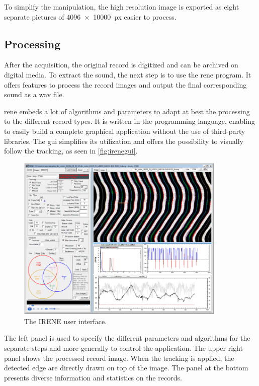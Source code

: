 To simplify the manipulation, the high resolution image is exported as eight separate pictures of \SI[product-units=single]{4096x10000}{px} easier to process.

\subsection{Processing}
\label{sec:processing}

After the acquisition, the original record is digitized and can be archived on digital media. To extract the sound, the next step is to use the \gls{rene} program. It offers features to process the record images and output the final corresponding sound as a \gls{wav} file.

\gls{rene} embeds a lot of algorithms and parameters to adapt at best the processing to the different record types. It is written in the \Csh{} programming language, enabling to easily build a complete graphical application without the use of third-party libraries. The \gls{gui} simplifies its utilization and offers the possibility to visually follow the tracking, as seen in \autoref{fig:irenegui}.

\begin{figure}[!ht]
\centering
\includegraphics[width=0.89\textwidth]{images/rene-gui}
\caption{The IRENE user interface.}
\label{fig:irenegui}
\end{figure}

The left panel is used to specify the different parameters and algorithms for the separate steps and more generally to control the application. The upper right panel shows the processed record image. When the tracking is applied, the detected edge are directly drawn on top of the image. The panel at the bottom presents diverse information and statistics on the records.

